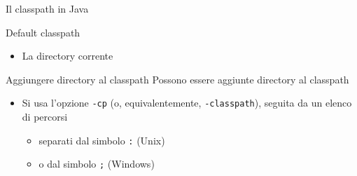 \documentclass[xcolor=dvipsnames,presentation]{beamer}
\begin{document}
\begin{frame}[allowframebreaks]{Il classpath in Java}
\begin{block}{Default classpath}
\begin{itemize}
\begin{itemize}
				\item \texttt{rt.jar} ed altri file importanti
				\item Contengono ad esempio \texttt{java.lang.Math}
			\end{itemize}
			\item La directory corrente
		\end{itemize}
	\end{block}
	\begin{block}{Aggiungere directory al classpath}
		Possono essere aggiunte directory al classpath
		\begin{itemize}
			\item Si usa l'opzione \texttt{-cp} (o, equivalentemente, \texttt{-classpath}), seguita da un elenco di percorsi
			\begin{itemize}
				\item separati dal simbolo \texttt{:} (Unix)
				\item o dal simbolo \texttt{;} (Windows)
			\end{itemize}
		\end{itemize}
	\end{block}
\end{frame}
\end{document}
